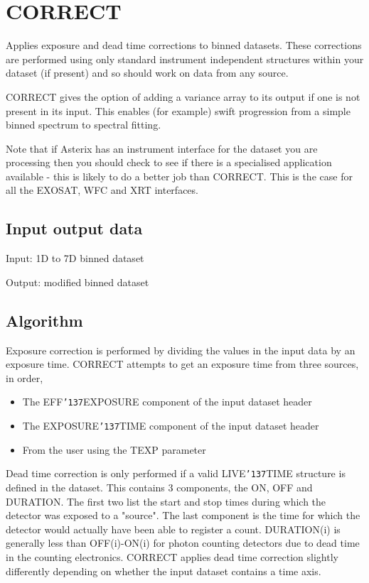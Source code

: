 \documentclass{book}
\renewcommand{\_}{{\tt\char'137}}     %
\begin{document}
\section{CORRECT}
Applies exposure and dead time corrections to binned datasets. These
corrections are performed using only standard instrument independent
structures within your dataset (if present) and so should work on
data from any source.
 
CORRECT gives the option of adding a variance array to its output if
one is not present in its input. This enables (for example) swift
progression from a simple binned spectrum to spectral fitting.
 
Note that if Asterix has an instrument interface for the dataset you
are processing then you should check to see if there is a specialised
application available - this is likely to do a better job than CORRECT.
This is the case for all the EXOSAT, WFC and XRT interfaces.
 
\subsection{Input output data}
Input: 1D to 7D binned dataset
 
Output: modified binned dataset
 
\subsection{Algorithm}
Exposure correction is performed by dividing the values in the input
data by an exposure time. CORRECT attempts to get an exposure time from
three sources, in order,
 
\begin{itemize}
\item The EFF\_EXPOSURE component of the input dataset header
\item The EXPOSURE\_TIME component of the input dataset header
\item From the user using the TEXP parameter
\end{itemize}
Dead time correction is only performed if a valid LIVE\_TIME structure
is defined in the dataset. This contains 3 components, the ON, OFF and
DURATION. The first two list the start and stop times during which the
detector was exposed to a "source". The last component is the time for
which the detector would actually have been able to register a count.
DURATION(i) is generally less than OFF(i)-ON(i) for photon counting
detectors due to dead time in the counting electronics. CORRECT applies
dead time correction slightly differently depending on whether the
input dataset contains a time axis.
 
\end{document}
